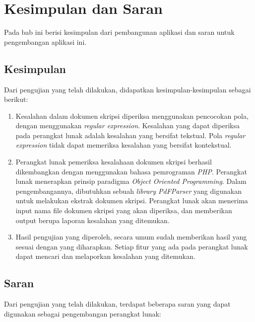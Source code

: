 \chapter{Kesimpulan dan Saran}
\label{chap:kesimpulan_dan_saran}

Pada bab ini berisi kesimpulan dari pembangunan aplikasi dan saran untuk pengembangan aplikasi ini.

\section{Kesimpulan}
\label{sec:kesimpulan}

Dari pengujian yang telah dilakukan, didapatkan kesimpulan-kesimpulan sebagai berikut:

\begin{enumerate}
	\item Kesalahan dalam dokumen skripsi diperiksa menggunakan pencocokan pola, dengan menggunakan \textit{regular expression}. Kesalahan yang dapat diperiksa pada perangkat lunak adalah kesalahan yang bersifat tekstual. Pola \textit{regular expression} tidak dapat memeriksa kesalahan yang bersifat kontekstual.
	
	\item Perangkat lunak pemeriksa kesalahaan dokumen skripsi berhasil dikembangkan dengan menggunakan bahasa pemrograman \textit{PHP}. Perangkat lunak menerapkan prinsip paradigma \textit{Object Oriented Programming}. Dalam pengembangannya, dibutuhkan sebuah \textit{library PdFParser} yang digunakan untuk melakukan ekstrak dokumen skripsi. Perangkat lunak akan menerima input nama file dokumen skripsi yang akan diperiksa, dan memberikan output berupa laporan kesalahan yang ditemukan.
	
	\item Hasil pengujian yang diperoleh, secara umum sudah memberikan hasil yang sesuai dengan yang diharapkan. Setiap fitur yang ada pada perangkat lunak dapat mencari dan melaporkan kesalahan yang ditemukan.
\end{enumerate}

\section{Saran}
\label{sec:saran}
Dari pengujian yang telah dilakukan, terdapat beberapa saran yang dapat digunakan sebagai pengembangan perangkat lunak:

